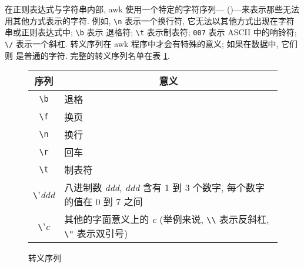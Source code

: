 在正则表达式与字符串内部, awk 使用一个特定的字符序列---{}
(){}---来表示那些无法用其他方式表示的字符. 例如,
\verb'\n'
表示一个换行符, 它无法以其他方式出现在字符串或正则表达式中; \verb'\b' 表示
退格符; \verb'\t' 表示制表符; \verb'007' 表示 ASCII 中的响铃符; \verb'\/'
表示一个斜杠. 转义序列在 awk 程序中才会有特殊的意义; 如果在数据中, 它们则
是普通的字符. 完整的转义序列名单在表 \ref{tbl:escape_sequences}.
\begin{figure}[ht]
\captionsetup{type=table}
\caption{转义序列}
\label{tbl:escape_sequences}
\begin{center}
\begin{tabular}{c|l}
    \hline
    \hline
    序列        &  \multicolumn{1}{c}{意义}  \\
    \hline
    \verb'\b'   & 退格  \\
    \verb'\f'   & 换页  \\
    \verb'\n'   & 换行 \\
    \verb'\r'   & 回车 \\
    \verb'\t'    & 制表符    \\
    \verb'\'\textit{ddd} & 八进制数 \textit{ddd}, \textit{ddd}
        含有 1 到 3 个数字, 每个数字的值在 0 到 7 之间 \\
    \verb'\'\textit{c} & 其他的字面意义上的 \textit{c}
        (举例来说, \verb'\\' 表示反斜杠, \verb'\"' 表示双引号) \\
    \hline
\end{tabular}
\end{center}
\end{figure}

